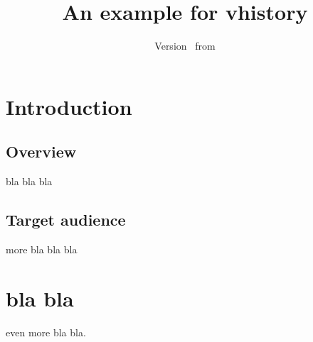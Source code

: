 \documentclass{scrartcl}
\begin{document}
\newcommand{\JW}{Jochen Wertenauer}
\newcommand{\PF}{Peter Foo}
\newcommand{\MB}{Mary Bar}

{\renewcommand{\setseparator}{ \and }
\title{An example for vhistory}
\author{\vhListAllAuthorsLong}
\date{Version \vhCurrentVersion\ from \vhCurrentDate}
\maketitle
}

\begin{versionhistory}
\end{versionhistory}

\tableofcontents
\clearpage

\section{Introduction}
\subsection{Overview}
bla bla bla

\subsection{Target audience}
more bla bla bla

\section{bla bla}
even more bla bla.
\end{document}
